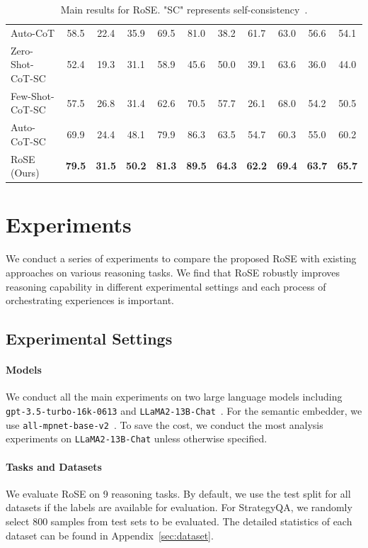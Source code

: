 \documentclass[11pt]{article}
\begin{document}
\begin{table}[t!]
{\begin{tabular}{lcccccccccc}
Auto-CoT             &   58.5 &	22.4 &	35.9 &	69.5 &	81.0 &	38.2 &	61.7 &	63.0  	& 56.6 	 & 54.1   \\ 
\hdashline
Zero-Shot-CoT-SC     &    52.4 &	19.3 &	31.1 &	58.9 &	45.6 &	50.0 &	39.1 &	63.6 	&36.0 &	44.0   \\ 
Few-Shot-CoT-SC      &  57.5 &	26.8 &	31.4 &	62.6 &	70.5 &	57.7 &	26.1 &	68.0 	&	54.2  &	50.5  \\ 
Auto-CoT-SC          &   69.9 &	24.4 	& 48.1	& 79.9 &	86.3 &	63.5 &	54.7 &	60.3  &	55.0   & 60.2   \\ 
\hdashline
RoSE (Ours)             &   \textbf{79.5} &	\textbf{31.5} &	\textbf{50.2} &	\textbf{81.3} &	\textbf{89.5} &	\textbf{64.3}  & \textbf{62.2}	&	\textbf{69.4} &	\textbf{63.7}  &  \textbf{65.7}  \\
\bottomrule
\end{tabular}}
\caption{Main results for RoSE. "SC" represents self-consistency~\cite{wang2023sc}.}
\label{tab:result_wo_stm}
\end{table}


\section{Experiments}
We conduct a series of experiments to compare the proposed RoSE with existing approaches on various reasoning tasks. We find that RoSE robustly improves reasoning capability in different experimental settings and each process of orchestrating experiences is important.

\subsection{Experimental Settings}

\paragraph{Models} We conduct all the main experiments on two large language models including \texttt{gpt-3.5-turbo-16k-0613} and \texttt{LLaMA2-13B-Chat}~\cite{TOUVRON2023llama2}. For the semantic embedder, we use \texttt{all-mpnet-base-v2}~\cite{reimers2013sbert}. To save the cost, we conduct the most analysis experiments on \texttt{LLaMA2-13B-Chat} unless otherwise specified.
\paragraph{Tasks and Datasets} We evaluate RoSE on 9 reasoning tasks. By default, we use the test split for all datasets if the labels are available for evaluation. For StrategyQA, we randomly select 800 samples from test sets to be evaluated. The detailed statistics of each dataset can be found in Appendix~\ref{sec:dataset}.
\end{document}
